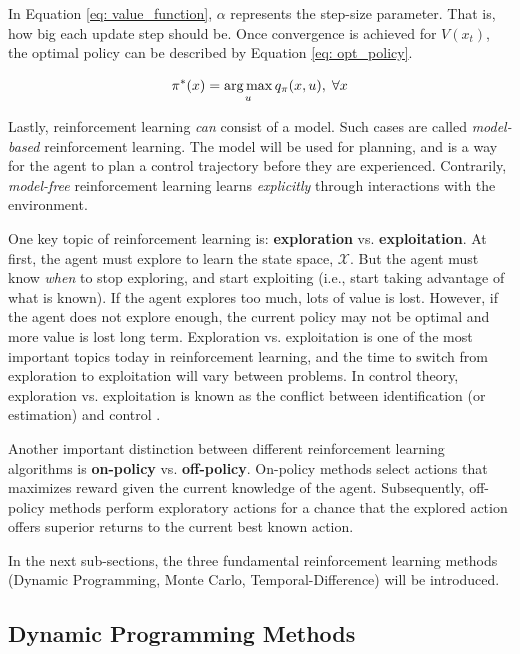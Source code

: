 In Equation \ref{eq: value_function}, $\alpha$ represents the step-size parameter.  That is, how big each update step should be.  Once convergence is achieved for $V(x_t)$, the optimal policy can be described by Equation \ref{eq: opt_policy}.  

\begin{equation}
    \centering
    \pi^*(x) = \argmax_u q_{\pi}(x, u), \; \forall x 
    \label{eq: opt_policy}
\end{equation}

Lastly, reinforcement learning \textit{can} consist of a model. Such cases are called \textit{model-based} reinforcement learning.  The model will be used for planning, and is a way for the agent to plan a control trajectory before they are experienced.  Contrarily, \textit{model-free} reinforcement learning learns \textit{explicitly} through interactions with the environment.

One key topic of reinforcement learning is: \textbf{exploration} vs. \textbf{exploitation}.  At first, the agent must explore to learn the state space, $\mathcal{X}$.  But the agent must know \textit{when} to stop exploring, and start exploiting (i.e., start taking advantage of what is known).  If the agent explores too much, lots of value is lost.  However, if the agent does not explore enough, the current policy may not be optimal and more value is lost long term.  Exploration vs. exploitation is one of the most important topics today in reinforcement learning, and the time to switch from exploration to exploitation will vary between problems.  In control theory, exploration vs. exploitation is known as the conflict between identification (or estimation) and control \cite{explorevexploitcontrol}.  

Another important distinction between different reinforcement learning algorithms is \textbf{on-policy} vs. \textbf{off-policy}.  On-policy methods select actions that maximizes reward given the current knowledge of the agent.  Subsequently, off-policy methods perform exploratory actions for a chance that the explored action offers superior returns to the current best known action.

In the next sub-sections, the three fundamental reinforcement learning methods (Dynamic Programming, Monte Carlo, Temporal-Difference) will be introduced.

\subsection{Dynamic Programming Methods}
